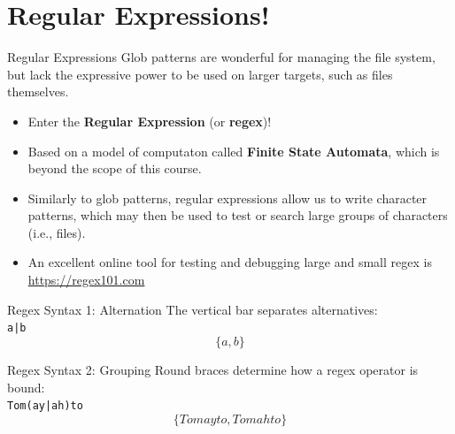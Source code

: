 \documentclass[11pt]{beamer}
\begin{document}
\section[Regex]{Regular Expressions!}

\begin{frame}{Regular Expressions}
Glob patterns are wonderful for managing the file system, but lack the expressive power to be used on larger targets, such as files themselves.

\begin{itemize}
\item Enter the \textbf{Regular Expression} (or \textbf{regex})!
\item Based on a model of computaton called \textbf{Finite State Automata}, which is beyond the scope of this course.
\item Similarly to glob patterns, regular expressions allow us to write character patterns, which may then be used to test or search large groups of characters (i.e., files).
\item An excellent online tool for testing and debugging large and small regex is \url{https://regex101.com}
\end{itemize}
\end{frame}

\begin{frame}[fragile=singleslide]{Regex Syntax 1: Alternation}
\center
The vertical bar separates alternatives: \\
\texttt{a|b}
$$ \{a, b\} $$ 
\end{frame}

\begin{frame}[fragile=singleslide]{Regex Syntax 2: Grouping}
\center 
Round braces determine how a regex operator is bound: \\
\texttt{Tom(ay|ah)to} 
$$\{Tomayto,Tomahto\}$$ 
\end{frame}
\end{document}
